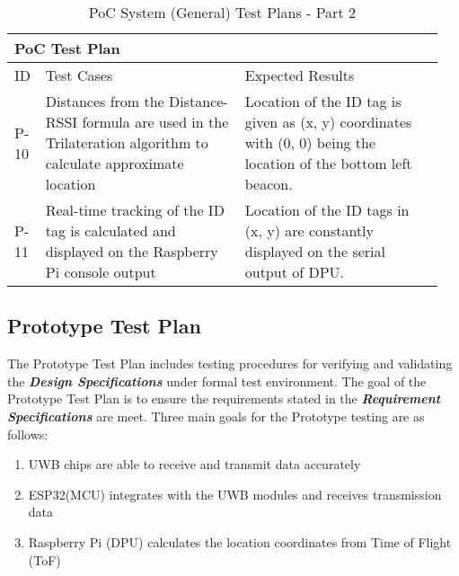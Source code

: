\begin{table}[h!]
    \centering
    
    \begin{tabular}{|m{0.05\linewidth}|m{0.45\linewidth}|m{0.45\linewidth}|} 
    \hline
    \multicolumn{3}{|l|}{\textbf{PoC Test Plan}}  \\ 
    \hline
    ID & Test Cases & Expected Results\\ 
    \hline
    
    P-10
    &  Distances from the Distance-RSSI formula are used in the Trilateration algorithm to calculate approximate location
    &  Location of the ID tag is given as (x, y) coordinates with (0, 0) being the location of the bottom left beacon. \\ 
    \hline

    P-11
    & Real-time tracking of the ID tag is calculated and displayed on the Raspberry Pi console output
    & Location of the ID tags in (x, y) are constantly displayed on the serial output of DPU. \\ 
    \hline

    \end{tabular}
    \caption{PoC System (General) Test Plans - Part 2}
\end{table}

\pagebreak
\subsection{Prototype Test Plan}
\medskip
The Prototype Test Plan includes testing procedures for verifying and validating the \textbf{\textit{Design Specifications}} under formal test environment. The goal of the Prototype Test Plan is to ensure the requirements stated in the  \textbf{\textit{Requirement Specifications}} are meet. Three main goals for the Prototype testing are as follows:
\begin{enumerate}
    \item UWB chips are able to receive and transmit data accurately
    \item ESP32(MCU) integrates with the UWB modules and receives transmission data 
    \item Raspberry Pi (DPU) calculates the location coordinates from Time of Flight (ToF)
\end{enumerate}



